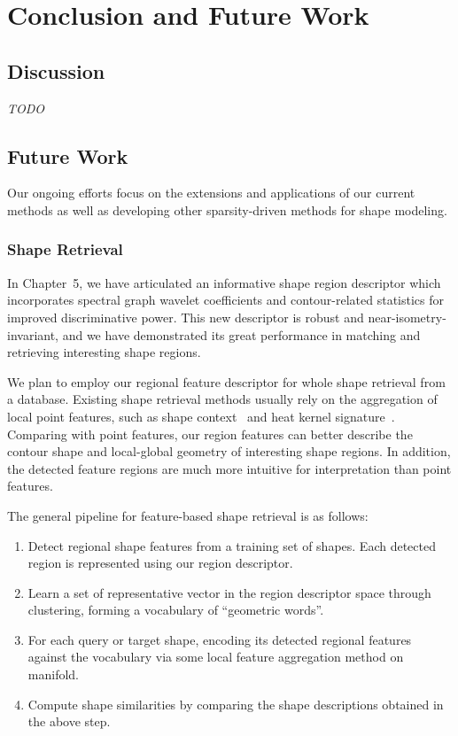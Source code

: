 \chapter{Conclusion and Future Work}

\section{Discussion}
\emph{TODO}

\section{Future Work}
Our ongoing efforts focus on the extensions and applications of our current methods as
well as developing other sparsity-driven methods for shape modeling.

\subsection{Shape Retrieval}
In Chapter~5, we have articulated an informative shape region descriptor which incorporates spectral graph wavelet coefficients
and contour-related statistics for improved discriminative power. This new descriptor is robust and near-isometry-invariant, and
we have demonstrated its great performance in matching and retrieving interesting shape regions.

We plan to employ our regional feature descriptor for whole shape retrieval from a database. Existing shape retrieval
methods usually rely on the aggregation of local point features, such as shape context~\cite{Belongie2002} and
heat kernel signature~\cite{Sun:2009:CGF}. Comparing with point features, our region features can better describe
the contour shape and local-global geometry of interesting shape regions. In addition, the detected feature regions
are much more intuitive for interpretation than point features.

The general pipeline for feature-based shape retrieval is as follows:
\begin{enumerate}
\item Detect regional shape features from a training set of shapes. Each detected region is represented using our region descriptor.
\item Learn a set of representative vector in the region descriptor space through clustering, forming a vocabulary of ``geometric words''.
\item For each query or target shape, encoding its detected regional features against the vocabulary via some local feature aggregation method
on manifold.
\item Compute shape similarities by comparing the shape descriptions obtained in the above step.
\end{enumerate}

